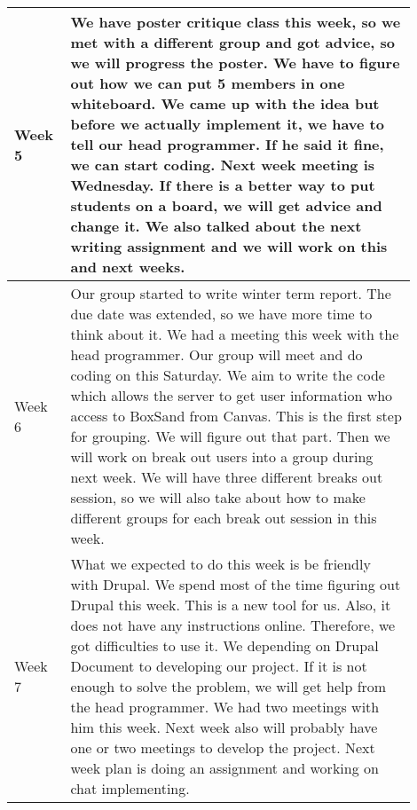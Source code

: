 \documentclass[10pt]{article}
\begin{document}
\begin{center}
\begin{tabular}{ | p{0.1\linewidth} | p{0.8\linewidth} | }
                Week 5 &  We have poster critique class this week, so we met with a different group and got advice, so we will progress the poster. We have to figure out how we can put 5 members in one whiteboard. We came up with the idea but before we actually implement it, we have to tell our head programmer. If he said it fine, we can start coding. Next week meeting is Wednesday. If there is a better way to put students on a board, we will get advice and change it. We also talked about the next writing assignment and we will work on this and next weeks.   \\ \hline
                Week 6 & Our group started to write winter term report. The due date was extended, so we have more time to think about it. We had a meeting this week with the head programmer. Our group will meet and do coding on this Saturday. We aim to write the code which allows the server to get user information who access to BoxSand from Canvas. This is the first step for grouping. We will figure out that part. Then we will work on break out users into a group during next week. We will have three different breaks out session, so we will also take about how to make different groups for each break out session in this week.   \\ \hline
                Week 7 & What we expected to do this week is be friendly with Drupal. We spend most of the time figuring out Drupal this week. This is a new tool for us. Also, it does not have any instructions online. Therefore, we got difficulties to use it. We depending on Drupal Document to developing our project. If it is not enough to solve the problem, we will get help from the head programmer. We had two meetings with him this week. Next week also will probably have one or two meetings to develop the project. Next week plan is doing an assignment and working on chat implementing.   \\ \hline
            \end{tabular}


\end{center}
\end{document}
